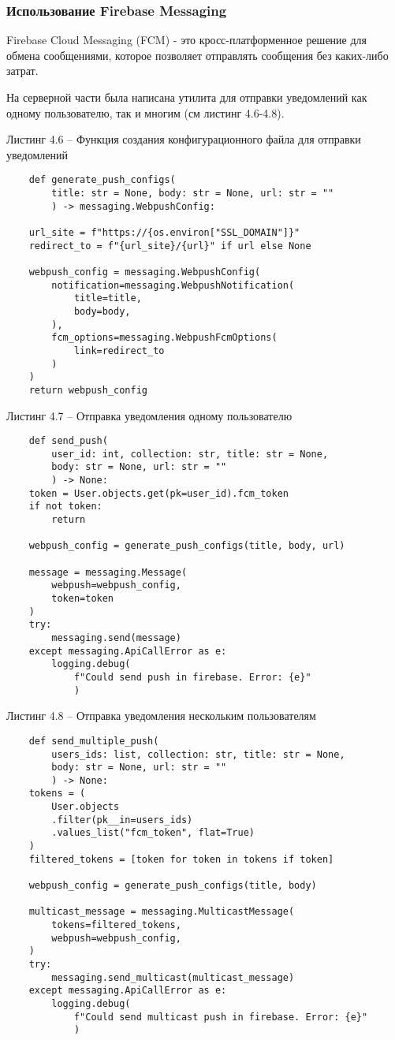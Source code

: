 \subsubsection{Использование Firebase Messaging}\hfill

Firebase Cloud Messaging (FCM) - это кросс-платформенное решение для обмена сообщениями, которое позволяет  отправлять сообщения без каких-либо затрат.

На серверной части была написана утилита для отправки уведомлений как одному пользователю, так и многим (см листинг 4.6-4.8).


Листинг 4.6 – Функция создания конфигурационного файла для отправки уведомлений
\begin{lstlisting}
    def generate_push_configs(
        title: str = None, body: str = None, url: str = ""
        ) -> messaging.WebpushConfig:

    url_site = f"https://{os.environ["SSL_DOMAIN"]}"
    redirect_to = f"{url_site}/{url}" if url else None

    webpush_config = messaging.WebpushConfig(
        notification=messaging.WebpushNotification(
            title=title,
            body=body,
        ),
        fcm_options=messaging.WebpushFcmOptions(
            link=redirect_to
        )
    )
    return webpush_config
\end{lstlisting}

Листинг 4.7 – Отправка уведомления одному пользователю
\begin{lstlisting}
    def send_push(
        user_id: int, collection: str, title: str = None,
        body: str = None, url: str = ""
        ) -> None:
    token = User.objects.get(pk=user_id).fcm_token
    if not token:
        return

    webpush_config = generate_push_configs(title, body, url)

    message = messaging.Message(
        webpush=webpush_config,
        token=token
    )
    try:
        messaging.send(message)
    except messaging.ApiCallError as e:
        logging.debug(
            f"Could send push in firebase. Error: {e}"
            )
\end{lstlisting}

Листинг 4.8 – Отправка уведомления нескольким пользователям
\begin{lstlisting}
    def send_multiple_push(
        users_ids: list, collection: str, title: str = None,
        body: str = None, url: str = ""
        ) -> None:
    tokens = (
        User.objects
        .filter(pk__in=users_ids)
        .values_list("fcm_token", flat=True)
    )
    filtered_tokens = [token for token in tokens if token]

    webpush_config = generate_push_configs(title, body)

    multicast_message = messaging.MulticastMessage(
        tokens=filtered_tokens,
        webpush=webpush_config,
    )
    try:
        messaging.send_multicast(multicast_message)
    except messaging.ApiCallError as e:
        logging.debug(
            f"Could send multicast push in firebase. Error: {e}"
            )
\end{lstlisting}

